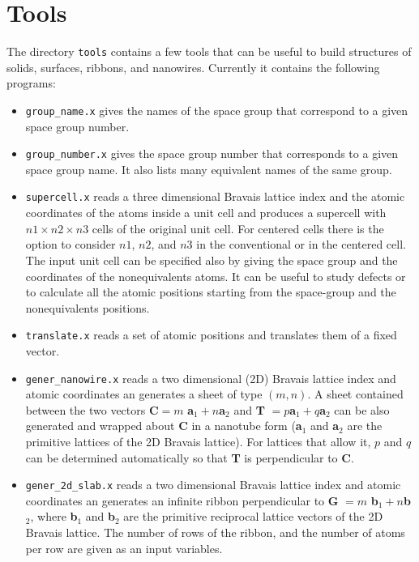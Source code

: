 \documentclass[12pt,a4paper]{article}
\begin{document}
\section{\color{coral}Tools}

The directory \texttt{tools} contains a few tools that can be useful to build
structures of solids, surfaces, ribbons, and nanowires. Currently it contains
the following programs:

\begin{itemize}

\item \texttt{group\_name.x} gives the names of the 
space group that correspond to a given space group number. 

\item \texttt{group\_number.x} gives the space group number
that corresponds to a given space group name. It also lists many equivalent
names of the same group.

\item \texttt{supercell.x} reads a three dimensional
Bravais lattice index and the atomic coordinates of the atoms inside a unit
cell and produces a supercell with $n1 \times n2 \times n3$ cells of the original
unit cell. For centered cells there is the option to consider $n1$, $n2$,
and $n3$ in the conventional or in the centered cell.
The input unit cell can be specified also by giving the space group and
the coordinates of the nonequivalents atoms.
It can be useful to study defects or to calculate all the 
atomic positions starting from the space-group and the 
nonequivalents positions.

\item \texttt{translate.x} reads a set of atomic positions
and translates them of a fixed vector.

\item \texttt{gener\_nanowire.x} reads a two dimensional (2D)
Bravais lattice index and atomic coordinates an generates a sheet of type
$(m,n)$. A sheet contained between the two vectors 
{\bf C}$ = m$ {\bf a}$_1 + n ${\bf a}$_2$ and {\bf T} $= p ${\bf a}$_1 + q ${\bf a}$_2$
can be also generated and wrapped about {\bf C} in a nanotube form 
({\bf a}$_1$ and {\bf a}$_2$ are the primitive lattices of the 2D Bravais 
lattice). 
For lattices that allow it, $p$ and $q$ can be determined automatically so that 
{\bf T} is perpendicular to {\bf C}.

\item \texttt{gener\_2d\_slab.x} reads a two dimensional 
Bravais lattice index and atomic coordinates an generates an infinite ribbon
perpendicular to {\bf G} $= m$ {\bf b}$_1 + n ${\bf b}$_2$, where 
{\bf b}$_1$ and {\bf b}$_2$ are the primitive reciprocal lattice vectors 
of the 2D Bravais lattice. The number of rows of the ribbon, and the number of
atoms per row are given as an input variables.


\end{itemize}
\end{document}
